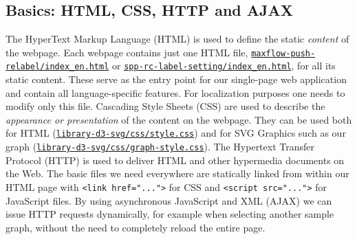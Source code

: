 \subsection{Basics: HTML, CSS, HTTP and AJAX}\label{sec:basic}
The HyperText Markup Language (HTML) is used to define the static \textit{content} of the webpage. Each webpage contains just one HTML file, \texttt{\href{http://www.adrian-haarbach.de/idp-graph-algorithms/implementation/maxflow-push-relabel/index_en.html}{maxflow-push-relabel/index\_en.html}} or \texttt{\href{http://www.adrian-haarbach.de/idp-graph-algorithms/implementation/spp-rc-label-setting/index_en.html}{spp-rc-label-setting/index\_en.html}}, for all its static content. These serve as the entry point for our single-page web application and contain all language-specific features. For localization purposes one needs to modify only this file. Cascading Style Sheets (CSS) are used to describe the \textit{appearance or presentation} of the content on the webpage. They can be used both for HTML (\texttt{\href{http://www.adrian-haarbach.de/idp-graph-algorithms/implementation/library-d3-svg/css/style.css}{library-d3-svg/css/style.css}}) and for SVG Graphics such as our graph (\texttt{\href{http://www.adrian-haarbach.de/idp-graph-algorithms/implementation/library-d3-svg/css/graph-style.css}{library-d3-svg/css/graph-style.css}}). The Hypertext Transfer Protocol (HTTP) is used to deliver HTML and other hypermedia documents on the Web. The basic files we need everywhere are statically linked from within our HTML page with \texttt{<link href="...">} for CSS and \texttt{<script src="...">} for JavaScript files. By using asynchronous JavaScript and XML (AJAX) we can issue HTTP requests dynamically, for example when selecting another sample graph, without the need to completely reload the entire page.

